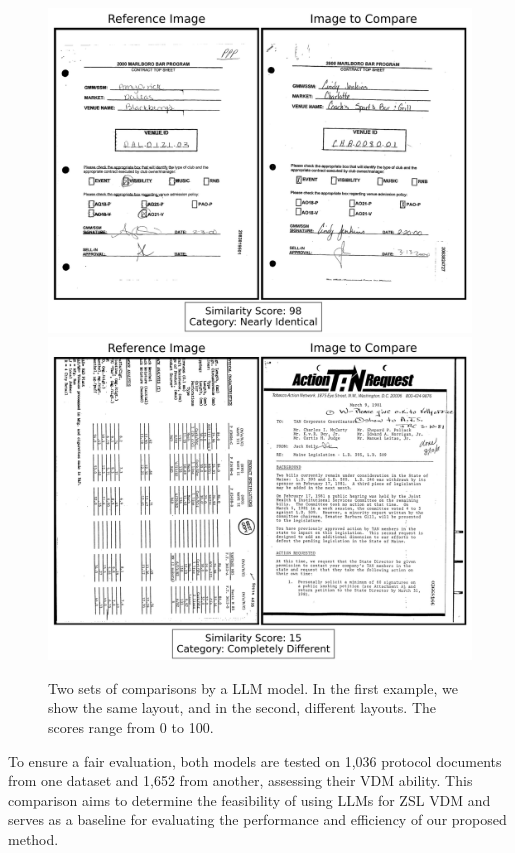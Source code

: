 \begin{figure}[htbp]
    \centering
    \includegraphics[width=.8\linewidth]{images/similar.png}
    \\[1em]
    \centering
    \includegraphics[width=.8\linewidth]{images/different.png}
    \caption{Two sets of comparisons by a LLM model. In the first example, we show the same layout, and in the second, different layouts. The scores range from 0 to 100.}
    \label{fig:document_comparison}
\end{figure}

To ensure a fair evaluation, both models are tested on 1,036 protocol documents from one dataset and 1,652 from another, assessing their \gls{VDM} ability. This comparison aims to determine the feasibility of using \glspl{LLM} for \gls{ZSL} \gls{VDM} and serves as a baseline for evaluating the performance and efficiency of our proposed method.

